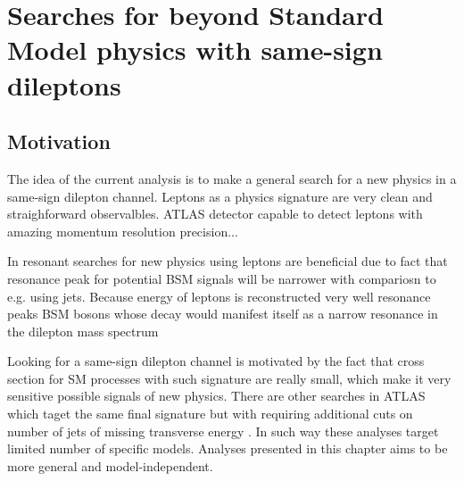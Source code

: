 \chapter{Searches for beyond Standard Model physics with same-sign dileptons}
\label{chap:SS}
\section{Motivation}



The idea of the current analysis is to make a general search for a new physics in a same-sign dilepton channel. \toFix
Leptons as a physics signature are very clean and straighforward observalbles. 
ATLAS detector capable to detect leptons with amazing momentum resolution precision... 

In resonant searches for new physics using leptons are beneficial due to fact that resonance peak for potential BSM signals will be narrower with compariosn to e.g. using jets.
Because energy of leptons is reconstructed very well resonance peaks 
BSM bosons whose decay would manifest itself as a narrow resonance in the dilepton mass spectrum

Looking for a same-sign dilepton channel is motivated by the fact that cross section for SM processes with such signature are really small, which make 
it very sensitive possible signals of new physics.  \toFix
There are other searches in ATLAS which taget the same final signature but with requiring additional cuts on number of jets \toFix[link] of missing transverse energy \toFix[link].
In such way these analyses target limited number of specific models.
Analyses presented in this chapter aims to be more general and model-independent. 

